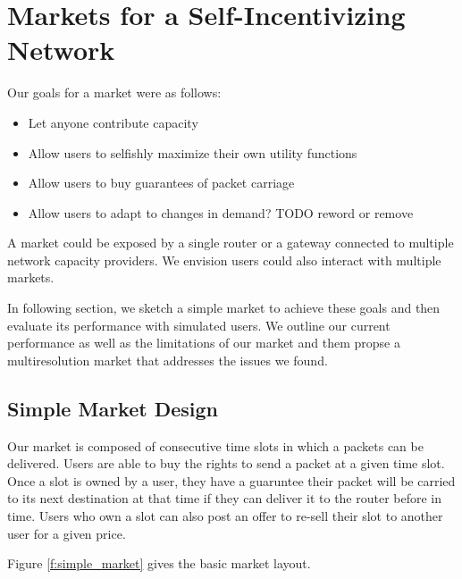 \newlength{\slotwidth}
\setlength{\slotwidth}{.103\textwidth}

\section{Markets for a Self-Incentivizing Network}
\label{sec:designs}
Our goals for a market were as follows:
\begin{itemize}
\item Let anyone contribute capacity
\item Allow users to selfishly maximize their own utility functions
\item Allow users to buy guarantees of packet carriage
\item Allow users to adapt to changes in demand? TODO reword or remove
\end{itemize}
A market could be exposed by a single router or a gateway connected to multiple network capacity providers.
We envision users could also interact with multiple markets.

In following section, we sketch a simple market to achieve these goals and then evaluate its performance with simulated users.
We outline our current performance as well as the limitations of our market and them propse a multiresolution market that addresses the issues we found.

\subsection{Simple Market Design}
Our market is composed of consecutive time slots in which a packets can be delivered. Users are able to buy the rights to send a packet at a given time slot.
Once a slot is owned by a user, they have a guaruntee their packet will be carried to its next destination at that time if they can deliver it to the router before in time. Users who own a slot can also post an offer to re-sell their slot to another user for a given price.

Figure \ref{f:simple_market} gives the basic market layout.


